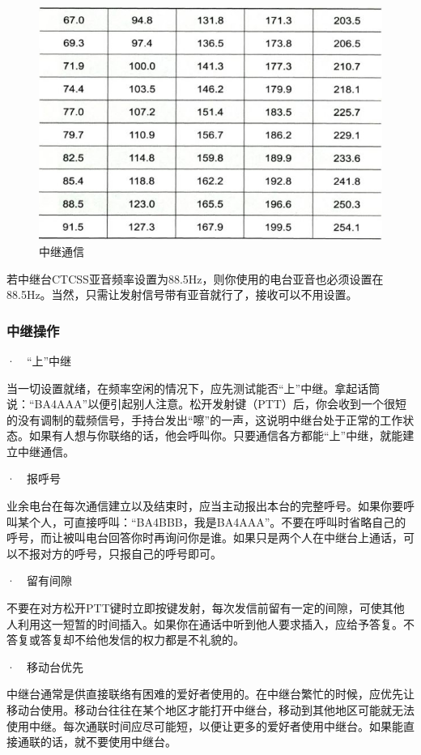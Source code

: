 \documentclass[12pt,UTF8]{ctexbook}
\begin{document}
\begin{figure}[htbp]
	\centering
	\includegraphics[width=0.7\linewidth]{39}
	\caption{中继通信}
	\label{fig:1}
\end{figure}

若中继台CTCSS亚音频率设置为88.5Hz，则你使用的电台亚音也必须设置在88.5Hz。当然，只需让发射信号带有亚音就行了，接收可以不用设置。

\subsubsection{中继操作}

·　“上”中继

当一切设置就绪，在频率空闲的情况下，应先测试能否“上”中继。拿起话筒说：“BA4AAA”以便引起别人注意。松开发射键（PTT）后，你会收到一个很短的没有调制的载频信号，手持台发出“嚓”的一声，这说明中继台处于正常的工作状态。如果有人想与你联络的话，他会呼叫你。只要通信各方都能“上”中继，就能建立中继通信。

·　报呼号

业余电台在每次通信建立以及结束时，应当主动报出本台的完整呼号。如果你要呼叫某个人，可直接呼叫：“BA4BBB，我是BA4AAA”。不要在呼叫时省略自己的呼号，而让被叫电台回答你时再询问你是谁。如果只是两个人在中继台上通话，可以不报对方的呼号，只报自己的呼号即可。

·　留有间隙

不要在对方松开PTT键时立即按键发射，每次发信前留有一定的间隙，可使其他人利用这一短暂的时间插入。如果你在通话中听到他人要求插入，应给予答复。不答复或答复却不给他发信的权力都是不礼貌的。

·　移动台优先

中继台通常是供直接联络有困难的爱好者使用的。在中继台繁忙的时候，应优先让移动台使用。移动台往往在某个地区才能打开中继台，移动到其他地区可能就无法使用中继。每次通联时间应尽可能短，以便让更多的爱好者使用中继台。如果能直接通联的话，就不要使用中继台。
\end{document}
